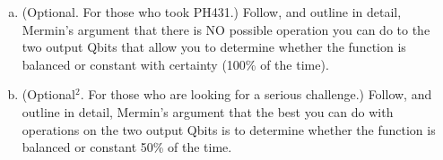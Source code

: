 \documentclass{book}
\theoremstyle{definition}
\begin{document}
\begin{enumerate}[(a)]
	
	\item (Optional. For those who took PH431.) Follow, and outline in detail, Mermin’s argument
	that there is NO possible operation you can do to the two output Qbits that allow you
	to determine whether the function is balanced or constant with certainty (100\% of the
	time).
	
	
	\item (Optional$^2$. For those who are looking for a serious challenge.) Follow, and outline in
	detail, Mermin’s argument that the best you can do with operations on the two output
	Qbits is to determine whether the function is balanced or constant 50\% of the time.
	
	
	
	
	
	
	
	
	
	
\end{enumerate}
\end{document}
